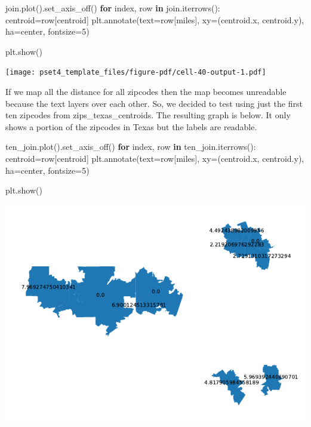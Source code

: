 \documentclass[
  letterpaper,
  DIV=11,
  numbers=noendperiod]{scrartcl}
\newenvironment{Shaded}{\begin{snugshade}}{\end{snugshade}}
\newcommand{\ControlFlowTok}[1]{\textcolor[rgb]{0.00,0.23,0.31}{\textbf{#1}}}
\newcommand{\DecValTok}[1]{\textcolor[rgb]{0.68,0.00,0.00}{#1}}
\newcommand{\KeywordTok}[1]{\textcolor[rgb]{0.00,0.23,0.31}{\textbf{#1}}}
\newcommand{\NormalTok}[1]{\textcolor[rgb]{0.00,0.23,0.31}{#1}}
\newcommand{\OperatorTok}[1]{\textcolor[rgb]{0.37,0.37,0.37}{#1}}
\newcommand{\StringTok}[1]{\textcolor[rgb]{0.13,0.47,0.30}{#1}}
\begin{document}
\begin{Shaded}
\begin{Highlighting}[]
\NormalTok{join.plot().set\_axis\_off()}
\ControlFlowTok{for}\NormalTok{ index, row }\KeywordTok{in}\NormalTok{ join.iterrows():}
\NormalTok{    centroid}\OperatorTok{=}\NormalTok{row[}\StringTok{\textquotesingle{}centroid\textquotesingle{}}\NormalTok{]}
\NormalTok{    plt.annotate(text}\OperatorTok{=}\NormalTok{row[}\StringTok{\textquotesingle{}miles\textquotesingle{}}\NormalTok{], xy}\OperatorTok{=}\NormalTok{(centroid.x, centroid.y),}
\NormalTok{    ha}\OperatorTok{=}\StringTok{\textquotesingle{}center\textquotesingle{}}\NormalTok{, fontsize}\OperatorTok{=}\DecValTok{5}\NormalTok{)}

\NormalTok{plt.show()}
\end{Highlighting}
\end{Shaded}

\texttt{[image: pset4\_template\_files/figure-pdf/cell-40-output-1.pdf]}

If we map all the distance for all zipcodes then the map becomes
unreadable because the text layers over each other. So, we decided to
test using just the first ten zipcodes from zips\_texas\_centroids. The
resulting graph is below. It only shows a portion of the zipcodes in
Texas but the labels are readable.

\begin{Shaded}
\begin{Highlighting}[]
\NormalTok{ten\_join.plot().set\_axis\_off()}
\ControlFlowTok{for}\NormalTok{ index, row }\KeywordTok{in}\NormalTok{ ten\_join.iterrows():}
\NormalTok{    centroid}\OperatorTok{=}\NormalTok{row[}\StringTok{\textquotesingle{}centroid\textquotesingle{}}\NormalTok{]}
\NormalTok{    plt.annotate(text}\OperatorTok{=}\NormalTok{row[}\StringTok{\textquotesingle{}miles\textquotesingle{}}\NormalTok{], xy}\OperatorTok{=}\NormalTok{(centroid.x, centroid.y),}
\NormalTok{    ha}\OperatorTok{=}\StringTok{\textquotesingle{}center\textquotesingle{}}\NormalTok{, fontsize}\OperatorTok{=}\DecValTok{5}\NormalTok{)}

\NormalTok{plt.show()}
\end{Highlighting}
\end{Shaded}

\includegraphics{pset4_template_files/figure-pdf/cell-41-output-1.pdf}
\end{document}

